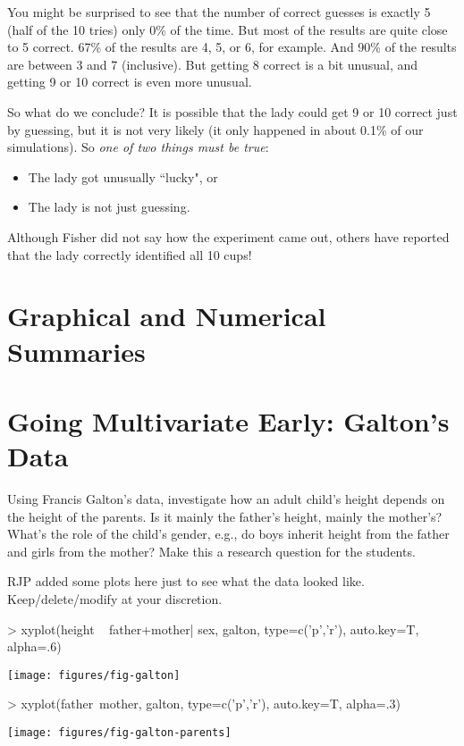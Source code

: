 You might be surprised to see that the number of correct guesses
is exactly 5 (half of the 10 tries) only 
0\%
of the time.  But most of the results are quite close to 5 correct.
67\% of the results are 
4, 5, or 6, for example.
And 90\% of the results 
are  between 3 and 7 (inclusive).
But getting 8 correct is a bit unusual, and getting 9 or 10 correct is even 
more unusual.  

So what do we conclude?  It is possible that the lady could get 9 or 10 correct
just by guessing, but it is not very likely (it only happened in about
0.1\% of our simulations). 
So \emph{one of two things must be true}:
\begin{itemize}
\item The lady got unusually ``lucky", or 
\item The lady is not just guessing.
\end{itemize}

Although Fisher did not say how the experiment came out, others have reported
that the lady correctly identified all 10 cups!
\cite{salsburg}




\section{Graphical and Numerical Summaries}

\section{Going Multivariate Early: Galton's Data}

Using Francis Galton's data, investigate how an adult child's height depends on the height of the parents.  Is
it mainly the father's height, mainly the mother's?  What's the role
of the child's gender, e.g., do boys inherit height from the father
and girls from the mother?  Make this a research question for the students.  

RJP added some plots here just to see what the data looked like.  
Keep/delete/modify at your discretion.

\begin{center}
\begin{Schunk}
\begin{Sinput}
> xyplot(height ~ father+mother| sex, galton, type=c('p','r'), auto.key=T, alpha=.6)
\end{Sinput}
\end{Schunk}
\texttt{[image: figures/fig-galton]}
\begin{Schunk}
\begin{Sinput}
> xyplot(father~mother, galton, type=c('p','r'), auto.key=T, alpha=.3)
\end{Sinput}
\end{Schunk}
\texttt{[image: figures/fig-galton-parents]}
\end{center}
